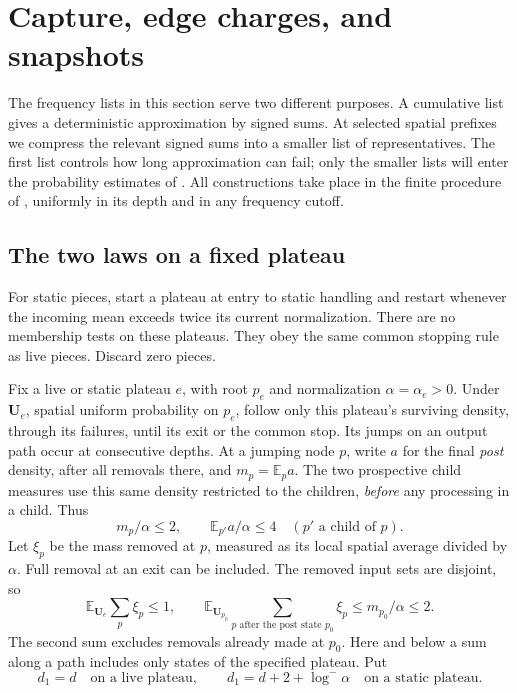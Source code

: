\section{Capture, edge charges, and snapshots}\label{sec:capture}

The frequency lists in this section serve two different purposes. A cumulative
list gives a deterministic approximation by signed sums. At selected spatial
prefixes we compress the relevant signed sums into a smaller list of
representatives. The first list controls how long approximation can fail; only
the smaller lists will enter the probability estimates of
. All constructions take place in the finite procedure of
, uniformly in its depth and in any frequency cutoff.

\subsection{The two laws on a fixed plateau}

For static pieces, start a plateau at entry to static handling and restart
whenever the incoming mean exceeds twice its current normalization. There are
no membership tests on these plateaus. They obey the same common stopping rule
as live pieces. Discard zero pieces.

Fix a live or static plateau $e$, with root $p_e$ and normalization
$\alpha=\alpha_e>0$. Under $\mathbf U_e$, spatial uniform probability on
$p_e$, follow only this plateau's surviving density, through its failures,
until its exit or the common stop. Its jumps on an output path occur at
consecutive depths. At a jumping node $p$, write $a$ for the final
\emph{post} density, after all removals there, and $m_p=\mathbb E_p a$.
The two prospective child measures use this same density restricted to the
children, \emph{before} any processing in a child. Thus
\begin{equation}\label{eq:07-mass-bounds}
  m_p/\alpha\le2,
  \qquad \mathbb E_{p'}a/\alpha\le4
  \quad(p'\text{ a child of }p).
\end{equation}
Let $\xi_p$ be the mass removed at $p$, measured as its local spatial average
divided by $\alpha$. Full removal at an exit can be included. The removed
input sets are disjoint, so
\begin{equation}\label{eq:07-kill-bounds}
 \mathbb E_{\mathbf U_e}\sum_p\xi_p\le1,
 \qquad
 \mathbb E_{\mathbf U_{p_0}}\sum_{p\text{ after the post state }p_0}\xi_p
       \le m_{p_0}/\alpha\le2.
\end{equation}
The second sum excludes removals already made at $p_0$. Here and below a sum
along a path includes only states of the specified plateau. Put
\[
 d_1=d\quad\text{on a live plateau},\qquad
 d_1=d+2+\log^-\alpha\quad\text{on a static plateau}.
\]

